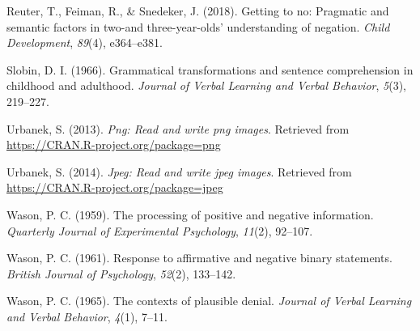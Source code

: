 \documentclass[man,floatsintext]{apa6}
\begin{document}
\leavevmode\hypertarget{ref-reuter2018no}{}%
Reuter, T., Feiman, R., \& Snedeker, J. (2018). Getting to no: Pragmatic and semantic factors in two-and three-year-olds' understanding of negation. \emph{Child Development}, \emph{89}(4), e364--e381.

\leavevmode\hypertarget{ref-slobin1966grammatical}{}%
Slobin, D. I. (1966). Grammatical transformations and sentence comprehension in childhood and adulthood. \emph{Journal of Verbal Learning and Verbal Behavior}, \emph{5}(3), 219--227.

\leavevmode\hypertarget{ref-R-png}{}%
Urbanek, S. (2013). \emph{Png: Read and write png images}. Retrieved from \url{https://CRAN.R-project.org/package=png}

\leavevmode\hypertarget{ref-R-jpeg}{}%
Urbanek, S. (2014). \emph{Jpeg: Read and write jpeg images}. Retrieved from \url{https://CRAN.R-project.org/package=jpeg}

\leavevmode\hypertarget{ref-wason1959processing}{}%
Wason, P. C. (1959). The processing of positive and negative information. \emph{Quarterly Journal of Experimental Psychology}, \emph{11}(2), 92--107.

\leavevmode\hypertarget{ref-wason1961response}{}%
Wason, P. C. (1961). Response to affirmative and negative binary statements. \emph{British Journal of Psychology}, \emph{52}(2), 133--142.

\leavevmode\hypertarget{ref-wason1965contexts}{}%
Wason, P. C. (1965). The contexts of plausible denial. \emph{Journal of Verbal Learning and Verbal Behavior}, \emph{4}(1), 7--11.

\endgroup
\end{document}
